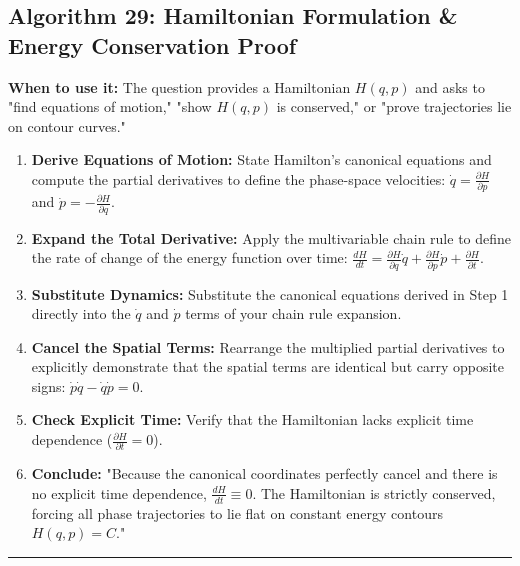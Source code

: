 \documentclass[11pt, a4paper]{report}
\begin{document}
\subsection*{Algorithm 29: Hamiltonian Formulation \& Energy Conservation Proof}
\textbf{When to use it:} The question provides a Hamiltonian $H(q,p)$ and asks to "find equations of motion," "show $H(q,p)$ is conserved," or "prove trajectories lie on contour curves."
\begin{enumerate}[label=\textbf{\arabic*.}]
    \item \textbf{Derive Equations of Motion:} State Hamilton's canonical equations and compute the partial derivatives to define the phase-space velocities: $\dot{q} = \frac{\partial H}{\partial p}$ and $\dot{p} = -\frac{\partial H}{\partial q}$.
    \item \textbf{Expand the Total Derivative:} Apply the multivariable chain rule to define the rate of change of the energy function over time: $\frac{dH}{dt} = \frac{\partial H}{\partial q}\dot{q} + \frac{\partial H}{\partial p}\dot{p} + \frac{\partial H}{\partial t}$.
    \item \textbf{Substitute Dynamics:} Substitute the canonical equations derived in Step 1 directly into the $\dot{q}$ and $\dot{p}$ terms of your chain rule expansion.
    \item \textbf{Cancel the Spatial Terms:} Rearrange the multiplied partial derivatives to explicitly demonstrate that the spatial terms are identical but carry opposite signs: $\dot{p}\dot{q} - \dot{q}\dot{p} = 0$.
    \item \textbf{Check Explicit Time:} Verify that the Hamiltonian lacks explicit time dependence ($\frac{\partial H}{\partial t} = 0$).
    \item \textbf{Conclude:} "Because the canonical coordinates perfectly cancel and there is no explicit time dependence, $\frac{dH}{dt} \equiv 0$. The Hamiltonian is strictly conserved, forcing all phase trajectories to lie flat on constant energy contours $H(q,p) = C$."
\end{enumerate}
\vspace{1em}
\noindent\rule{\textwidth}{0.4pt}
\vspace{1em}
\end{document}
